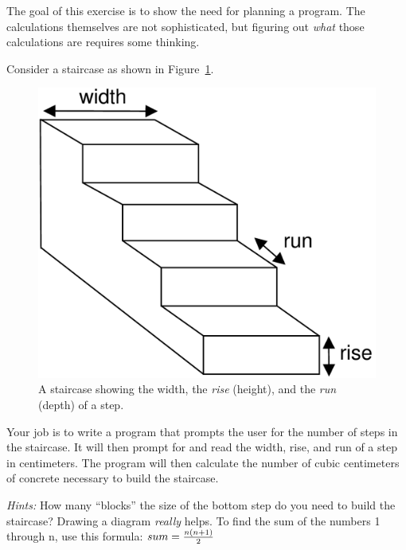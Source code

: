 \begin{exercise}
The goal of this exercise is to show the need for planning a program. The calculations themselves are not sophisticated, but figuring out {\em what} those calculations are requires some thinking.

Consider a staircase as shown in Figure~\ref{fig.staircase}.

\begin{figure}[!h]
\begin{center}
\includegraphics[scale=0.3]{figs/staircase.pdf}
\caption{A staircase showing the width, the {\em rise} (height), and the {\em run} (depth) of a step.}
\label{fig.staircase}
\end{center}
\end{figure}

Your job is to write a program that prompts the user for the number of steps in the staircase. It will then prompt for and read the width, rise, and run of a step in centimeters. The program will then calculate the number of cubic centimeters of concrete necessary to build the staircase.

{\em Hints:} How many ``blocks'' the size of the bottom step do you need to build the staircase? Drawing a diagram {\em really} helps. To find the sum of the numbers 1 through n, use this formula: $sum = {{n(n+1)}\over 2}$
\end{exercise}


